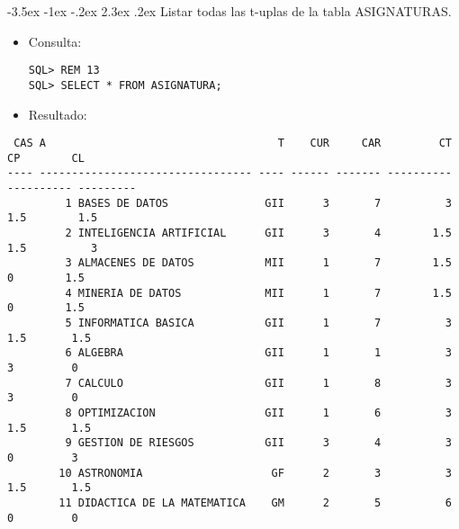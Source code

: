 \documentclass[11pt]{report}
\makeatletter
\renewcommand\chapter{\@startsection{chapter}{0}{\z@}%
    {-3.5ex \@plus -1ex \@minus -.2ex}%
    {2.3ex \@plus.2ex}%
    {\normalfont\Large\bfseries}}
\makeatother
\begin{document}
\chapter{Listar todas las t-uplas de la tabla ASIGNATURAS.}
\begin{itemize}
  \item Consulta:
  \begin{verbatim}
SQL> REM 13
SQL> SELECT * FROM ASIGNATURA;
  \end{verbatim}
  \item{Resultado:}
\end{itemize}
  \begin{verbatim}
 CAS A                                    T    CUR     CAR         CT         CP        CL                                                           
---- --------------------------------- ---- ------ ------- ---------- ---------- ---------                                                          
         1 BASES DE DATOS               GII      3       7          3       1.5        1.5                                                           
         2 INTELIGENCIA ARTIFICIAL      GII      3       4        1.5       1.5          3                                                           
         3 ALMACENES DE DATOS           MII      1       7        1.5         0        1.5                                                           
         4 MINERIA DE DATOS             MII      1       7        1.5         0        1.5                                                           
         5 INFORMATICA BASICA           GII      1       7          3        1.5       1.5                                                           
         6 ALGEBRA                      GII      1       1          3          3         0                                                           
         7 CALCULO                      GII      1       8          3          3         0                                                           
         8 OPTIMIZACION                 GII      1       6          3        1.5       1.5                                                           
         9 GESTION DE RIESGOS           GII      3       4          3          0         3                                                           
        10 ASTRONOMIA                    GF      2       3          3        1.5       1.5                                                           
        11 DIDACTICA DE LA MATEMATICA    GM      2       5          6          0         0                                                           


\end{verbatim}
\end{document}
